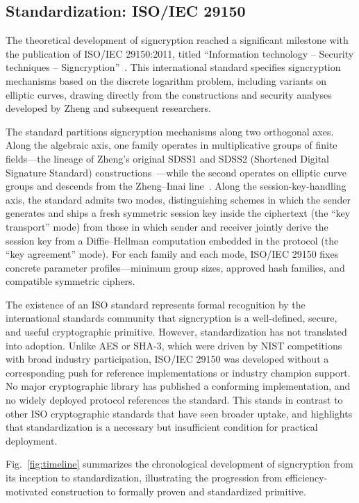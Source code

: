 \documentclass[conference]{IEEEtran}
\begin{document}
\subsection{Standardization: ISO/IEC 29150}

The theoretical development of signcryption reached a significant milestone with the publication of ISO/IEC 29150:2011, titled ``Information technology -- Security techniques -- Signcryption''~\cite{iso29150}. This international standard specifies signcryption mechanisms based on the discrete logarithm problem, including variants on elliptic curves, drawing directly from the constructions and security analyses developed by Zheng and subsequent researchers.

The standard partitions signcryption mechanisms along two orthogonal axes. Along the algebraic axis, one family operates in multiplicative groups of finite fields---the lineage of Zheng's original SDSS1 and SDSS2 (Shortened Digital Signature Standard) constructions~\cite{zheng1997}---while the second operates on elliptic curve groups and descends from the Zheng--Imai line~\cite{zheng1998}. Along the session-key-handling axis, the standard admits two modes, distinguishing schemes in which the sender generates and ships a fresh symmetric session key inside the ciphertext (the ``key transport'' mode) from those in which sender and receiver jointly derive the session key from a Diffie--Hellman computation embedded in the protocol (the ``key agreement'' mode). For each family and each mode, ISO/IEC 29150 fixes concrete parameter profiles---minimum group sizes, approved hash families, and compatible symmetric ciphers.

The existence of an ISO standard represents formal recognition by the international standards community that signcryption is a well-defined, secure, and useful cryptographic primitive. However, standardization has not translated into adoption. Unlike AES or SHA-3, which were driven by NIST competitions with broad industry participation, ISO/IEC 29150 was developed without a corresponding push for reference implementations or industry champion support. No major cryptographic library has published a conforming implementation, and no widely deployed protocol references the standard. This stands in contrast to other ISO cryptographic standards that have seen broader uptake, and highlights that standardization is a necessary but insufficient condition for practical deployment.

Fig.~\ref{fig:timeline} summarizes the chronological development of signcryption from its inception to standardization, illustrating the progression from efficiency-motivated construction to formally proven and standardized primitive.
\end{document}
